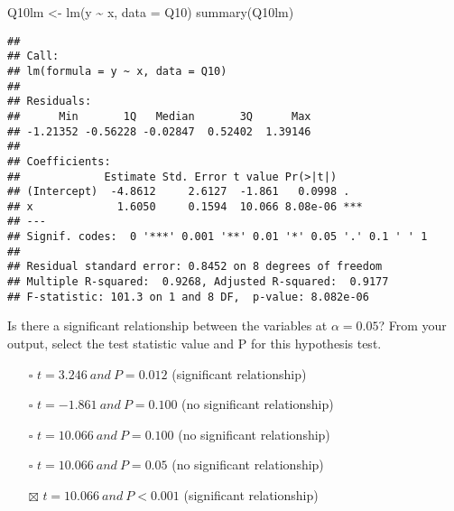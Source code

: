 \documentclass[
]{article}
\newenvironment{Shaded}{\begin{snugshade}}{\end{snugshade}}
\newcommand{\AttributeTok}[1]{\textcolor[rgb]{0.77,0.63,0.00}{#1}}
\newcommand{\FunctionTok}[1]{\textcolor[rgb]{0.00,0.00,0.00}{#1}}
\newcommand{\NormalTok}[1]{#1}
\newcommand{\OtherTok}[1]{\textcolor[rgb]{0.56,0.35,0.01}{#1}}
\newcommand{\SpecialCharTok}[1]{\textcolor[rgb]{0.00,0.00,0.00}{#1}}
\providecommand{\tightlist}{%
  \setlength{\itemsep}{0pt}\setlength{\parskip}{0pt}}
\begin{document}
\begin{Shaded}
\begin{Highlighting}[]
\NormalTok{Q10lm }\OtherTok{\textless{}{-}} \FunctionTok{lm}\NormalTok{(y }\SpecialCharTok{\textasciitilde{}}\NormalTok{ x, }\AttributeTok{data =}\NormalTok{ Q10)}
\FunctionTok{summary}\NormalTok{(Q10lm)}
\end{Highlighting}
\end{Shaded}

\begin{verbatim}
## 
## Call:
## lm(formula = y ~ x, data = Q10)
## 
## Residuals:
##      Min       1Q   Median       3Q      Max 
## -1.21352 -0.56228 -0.02847  0.52402  1.39146 
## 
## Coefficients:
##             Estimate Std. Error t value Pr(>|t|)    
## (Intercept)  -4.8612     2.6127  -1.861   0.0998 .  
## x             1.6050     0.1594  10.066 8.08e-06 ***
## ---
## Signif. codes:  0 '***' 0.001 '**' 0.01 '*' 0.05 '.' 0.1 ' ' 1
## 
## Residual standard error: 0.8452 on 8 degrees of freedom
## Multiple R-squared:  0.9268, Adjusted R-squared:  0.9177 
## F-statistic: 101.3 on 1 and 8 DF,  p-value: 8.082e-06
\end{verbatim}

Is there a significant relationship between the variables at
\(\alpha = 0.05\)? From your output, select the test statistic value and
P for this hypothesis test.

\begin{itemize}
\tightlist
\item[$\square$]
  \(t = 3.246\ and\ P = 0.012\) (significant relationship)
\item[$\square$]
  \(t = -1.861\ and\ P = 0.100\) (no significant relationship)
\item[$\square$]
  \(t = 10.066\ and\ P = 0.100\) (no significant relationship)
\item[$\square$]
  \(t = 10.066\ and\ P = 0.05\) (no significant relationship)
\item[$\boxtimes$]
  \(t = 10.066\ and\ P < 0.001\) (significant relationship)
\end{itemize}
\end{document}
